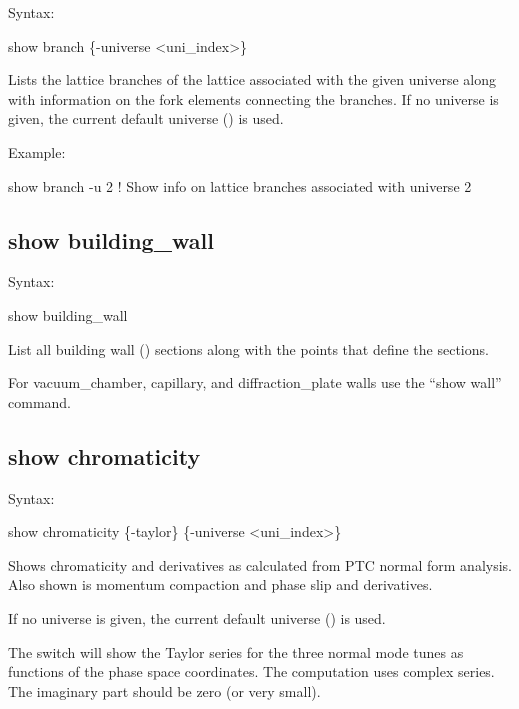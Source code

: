 {{{{{{{{Syntax:
\begin{example}
  show branch \{-universe <uni_index>\}
\end{example}

Lists the lattice branches of the lattice associated with the given universe along with information
on the fork elements connecting the branches.  If no universe is given, the current default universe
() is used.

Example:
\begin{example}
  show branch -u 2     ! Show info on lattice branches associated with universe 2
\end{example}


\subsection{show building_wall}
\label{s:show.building}

Syntax:
\begin{example}
  show building_wall
\end{example}

List all building wall () sections along with the points that define
the sections.

For vacuum_chamber, capillary, and diffraction_plate walls use the ``show wall'' command.


\subsection{show chromaticity}
\label{s:show.chrom}

Syntax:
\begin{example}
  show chromaticity \{-taylor\} \{-universe <uni_index>\} 
\end{example}

Shows chromaticity and derivatives as calculated from PTC normal form analysis. Also shown
is momentum compaction and phase slip and derivatives.

If no universe is given, the current default universe () is used.

The  switch will show the Taylor series for the three normal mode tunes as functions 
of the phase space coordinates. The computation uses complex series. The imaginary part should 
be zero (or very small).


}}}}}}}}
